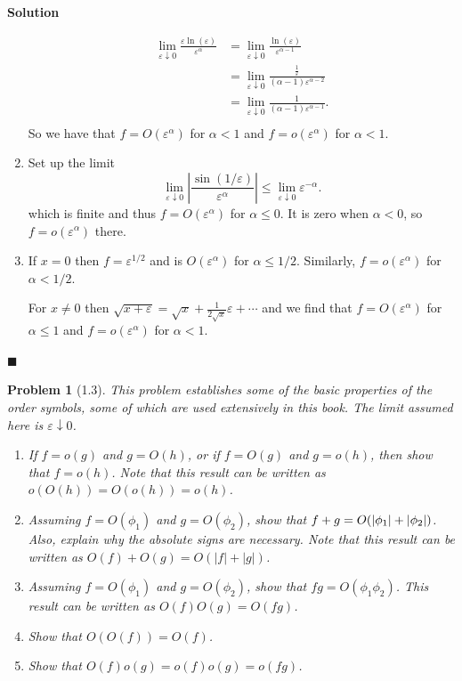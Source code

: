 \documentclass[11pt]{article}
\newcommand{\vep}{\varepsilon}
\DeclarePairedDelimiter\abs{\lvert}{\rvert}
\theoremstyle{problemstyle}
\newtheorem{problem}{Problem}
\newenvironment{solution}
  {\noindent\textbf{Solution}\quad}
  {\hfill$\blacksquare$\par\vspace{1em}}
\begin{document}
\begin{solution}
\begin{enumerate}[label=(\roman*)]
\begin{align*}
        \lim_{\vep \downarrow 0} \frac{\vep \ln(\vep)}{\vep^\alpha} 
          & = \lim_{\vep \downarrow 0} \frac{\ln(\vep)}{\vep^{\alpha - 1}} \\
          & = \lim_{\vep \downarrow 0} \frac{\frac{1}{\vep}}{(\alpha - 1) \vep^{\alpha - 2}} \\
          & = \lim_{\vep \downarrow 0} \frac{1}{(\alpha - 1) \vep^{\alpha - 1}}. \\
      \end{align*}
      So we have that $f = O(\vep^\alpha)$ for $\alpha < 1$ and $f = o(\vep^\alpha)$ for $\alpha
      < 1$.
    \item Set up the limit
      \[ \lim_{\vep \downarrow 0} \left\vert \frac{\sin(1/\vep)}{\vep^\alpha} \right\vert \leq
      \lim_{\vep \downarrow 0} \vep^{-\alpha}. \]
      which is finite and thus $f = O(\vep^\alpha)$ for $\alpha \leq 0$. It is zero when $\alpha <
      0$, so $f = o(\vep^\alpha)$ there.
    \item If $x = 0$ then $f = \vep^{1/2}$ and is $O(\vep^\alpha)$ for $\alpha \leq 1/2$. Similarly,
      $f = o(\vep^\alpha)$ for $\alpha < 1/2$.

      For $x \neq 0$ then $\sqrt{x + \vep} = \sqrt{x} + \frac{1}{2\sqrt{x}}\vep + \cdots$ and we
      find that $f = O(\vep^\alpha)$ for $\alpha \leq 1$ and $f = o(\vep^\alpha)$ for $\alpha < 1$.
      

  \end{enumerate}
\end{solution}

\newpage
\begin{problem}[1.3]
This problem establishes some of the basic properties of the order symbols, some of which are used
extensively in this book. The limit assumed here is $\vep \downarrow 0$.
\begin{enumerate}
\item If $f = o(g)$ and $g = O(h)$, or if $f = O(g)$ and $g = o(h)$, then show that $f = o(h)$. Note
  that this result can be written as $o(O(h)) = O(o(h)) = o(h)$.
\item Assuming $f = O(\phi_1)$ and $g = O(\phi_2)$, show that $f + g = O(\abs{\phi_1}  + \vert
  \phi_2 \vert)$. Also, explain why the absolute signs are necessary. Note that this result can be
  written as $O(f) + O(g) = O(|f| + |g|)$.
\item Assuming $f = O(\phi_1)$ and $g = O(\phi_2)$, show that $fg = O(\phi_1 \phi_2)$. This result
  can be written as $O(f) O(g) = O(fg)$.
\item Show that $O(O(f)) = O(f)$.
\item Show that $O(f)o(g) = o(f)o(g) = o(fg)$.
\end{enumerate}
\end{problem}
\end{document}
